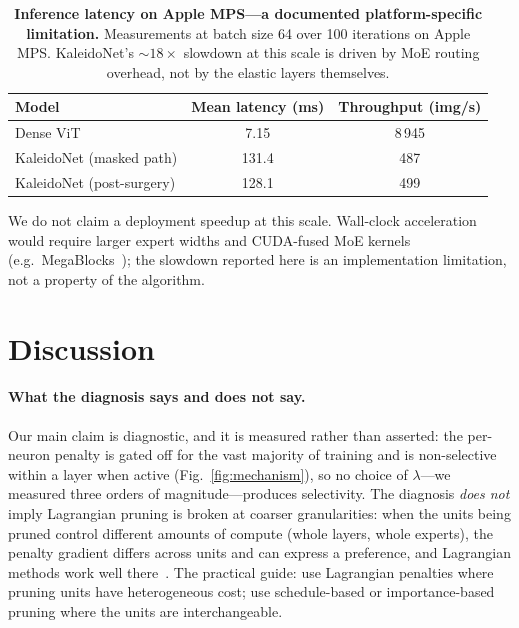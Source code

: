 \documentclass[fleqn,10pt]{article}
\begin{document}
\begin{table}[t]
\centering
\caption{\textbf{Inference latency on Apple MPS---a documented
platform-specific limitation.} Measurements at batch size 64 over
100 iterations on Apple MPS. KaleidoNet's $\sim\!18\times$ slowdown
at this scale is driven by MoE routing overhead, not by the elastic
layers themselves.}
\label{tab:latency}
\small
\begin{tabular}{lcc}
\toprule
\textbf{Model} & \textbf{Mean latency (ms)} & \textbf{Throughput (img/s)} \\
\midrule
Dense ViT                & 7.15   & 8\,945 \\
KaleidoNet (masked path) & 131.4  & 487   \\
KaleidoNet (post-surgery)& 128.1  & 499   \\
\bottomrule
\end{tabular}
\end{table}

We do not claim a deployment speedup at this scale. Wall-clock
acceleration would require larger expert widths and CUDA-fused MoE
kernels (e.g.\ MegaBlocks~\citep{gale2023megablocks}); the slowdown
reported here is an implementation limitation, not a property of the
algorithm.

\section*{Discussion}
\label{sec:discussion}

\paragraph{What the diagnosis says and does not say.}
Our main claim is diagnostic, and it is measured rather than
asserted: the per-neuron penalty is gated off for the vast majority
of training and is non-selective within a layer when active
(Fig.~\ref{fig:mechanism}), so no choice of $\lambda$---we measured
three orders of magnitude---produces selectivity. The diagnosis
\emph{does not} imply Lagrangian pruning is broken at coarser
granularities: when the units being pruned control different
amounts of compute (whole layers, whole experts), the penalty
gradient differs across units and can express a preference, and
Lagrangian methods work well there~\citep{gordon2018morphnet,
lemaire2019structured}. The practical guide: use Lagrangian
penalties where pruning units have heterogeneous cost; use
schedule-based or importance-based pruning where the units are
interchangeable.
\end{document}
